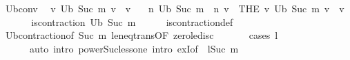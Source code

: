 \begin{isabellebody}
\isamarkupfalse%
%
\endisatagproof
{\isafoldproof}%
%
\isadelimproof
\isanewline
%
\endisadelimproof
\isanewline
{}\isamarkupfalse%
\ U\isactrlsub b{\isacharunderscore}{\kern0pt}conv{\isacharcolon}{\kern0pt}\isanewline
\ \ {\isachardoublequoteopen}{\isasymexists}{\isacharbang}{\kern0pt}v{\isachardot}{\kern0pt}\ U\isactrlsub b\ {\isacharparenleft}{\kern0pt}Suc\ m{\isacharparenright}{\kern0pt}\ v\ {\isacharequal}{\kern0pt}\ v{\isachardoublequoteclose}\ \isanewline
\ \ {\isachardoublequoteopen}{\isacharparenleft}{\kern0pt}{\isasymlambda}n{\isachardot}{\kern0pt}\ {\isacharparenleft}{\kern0pt}U\isactrlsub b\ {\isacharparenleft}{\kern0pt}Suc\ m{\isacharparenright}{\kern0pt}\ {\isacharcircum}{\kern0pt}{\isacharcircum}{\kern0pt}\ n{\isacharparenright}{\kern0pt}\ v{\isacharparenright}{\kern0pt}\ {\isasymlonglonglongrightarrow}\ {\isacharparenleft}{\kern0pt}THE\ v{\isachardot}{\kern0pt}\ U\isactrlsub b\ {\isacharparenleft}{\kern0pt}Suc\ m{\isacharparenright}{\kern0pt}\ v\ {\isacharequal}{\kern0pt}\ v{\isacharparenright}{\kern0pt}{\isachardoublequoteclose}\isanewline
%
\isadelimproof
%
\endisadelimproof
%
\isatagproof
{}\isamarkupfalse%
\ {\isacharminus}{\kern0pt}\isanewline
\ \ \isamarkupfalse%
\ {\isacharasterisk}{\kern0pt}{\isacharcolon}{\kern0pt}\ {\isachardoublequoteopen}is{\isacharunderscore}{\kern0pt}contraction\ {\isacharparenleft}{\kern0pt}U\isactrlsub b\ {\isacharparenleft}{\kern0pt}Suc\ m{\isacharparenright}{\kern0pt}{\isacharparenright}{\kern0pt}{\isachardoublequoteclose}\isanewline
\ \ \ \ \isamarkupfalse%
\ is{\isacharunderscore}{\kern0pt}contraction{\isacharunderscore}{\kern0pt}def\isanewline
\ \ \ \ \isamarkupfalse%
\ U\isactrlsub b{\isacharunderscore}{\kern0pt}contraction{\isacharbrackleft}{\kern0pt}of\ {\isachardoublequoteopen}Suc\ m{\isachardoublequoteclose}{\isacharbrackright}{\kern0pt}\ le{\isacharunderscore}{\kern0pt}neq{\isacharunderscore}{\kern0pt}trans{\isacharbrackleft}{\kern0pt}OF\ zero{\isacharunderscore}{\kern0pt}le{\isacharunderscore}{\kern0pt}disc{\isacharbrackright}{\kern0pt}\ \isanewline
\ \ \ \ \isamarkupfalse%
\ {\isacharparenleft}{\kern0pt}cases\ {\isachardoublequoteopen}l\ {\isacharequal}{\kern0pt}\ {}{\isachardoublequoteclose}{\isacharparenright}{\kern0pt}\isanewline
\ \ \ \ \ \ {\isacharparenleft}{\kern0pt}auto\ intro{\isacharbang}{\kern0pt}{\isacharcolon}{\kern0pt}\ power{\isacharunderscore}{\kern0pt}Suc{\isacharunderscore}{\kern0pt}less{\isacharunderscore}{\kern0pt}one\ intro{\isacharcolon}{\kern0pt}\ exI{\isacharbrackleft}{\kern0pt}of\ {\isacharunderscore}{\kern0pt}\ {\isachardoublequoteopen}l{\isacharcircum}{\kern0pt}{\isacharparenleft}{\kern0pt}Suc\ m{\isacharparenright}{\kern0pt}{\isachardoublequoteclose}{\isacharbrackright}{\kern0pt}{\isacharparenright}{\kern0pt}\isanewline

\end{isabellebody}
